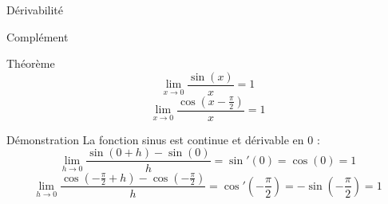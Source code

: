 \documentclass{cours}
\begin{document}
\begin{Gpartie}{Dérivabilité}
\begin{Spartie}{Complément}
\begin{SSpartie}{Théorème}
                \[\lim\limits_{x\to0}\frac{\sin(x)}{x}=1\] \[\lim\limits_{x\to0}\frac{\cos\left(x-\frac{\pi}{2}\right)}{x}=1\]
                \begin{SSSpartie}{Démonstration} 
                    La fonction sinus est continue et dérivable en $0$ : \[\lim\limits_{h\to0}\frac{\sin(0+h)-\sin(0)}{h}=\sin'(0)=\cos(0)=1\] \[\lim\limits_{h\to0}\frac{\cos\left(-\frac{\pi}{2}+h\right)-\cos\left(-\frac{\pi}{2}\right)}{h}=\cos'\left(-\frac{\pi}{2}\right)=-\sin\left(-\frac{\pi}{2}\right)=1\]
                \end{SSSpartie}
            \end{SSpartie}
        \end{Spartie}
    \end{Gpartie}
\end{document}
